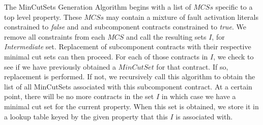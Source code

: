 
The MinCutSets Generation Algorithm begins with a list of $MCSs$ specific to a top level property. These $MCSs$ may contain a mixture of fault activation literals constrained to \textit{false} and %
and subcomponent contracts constrained to \textit{true}. We remove all constraints from each $MCS$ and call the resulting sets $I$, for \textit{Intermediate} set. Replacement of subcomponent contracts with their respective minimal cut sets can then proceed. For each of those contracts in $I$, we check to see if we have previously obtained a $MinCutSet$ for that contract. If so, replacement is performed. If not, we recursively call this algorithm to obtain the list of all %
MinCutSets associated with this subcomponent contract. At a certain point, there will be no more contracts in the set $I$ in which case we have a minimal cut set for the current property. When this set is obtained, we store it in a lookup table keyed by the given property that this $I$ is associated with. 



